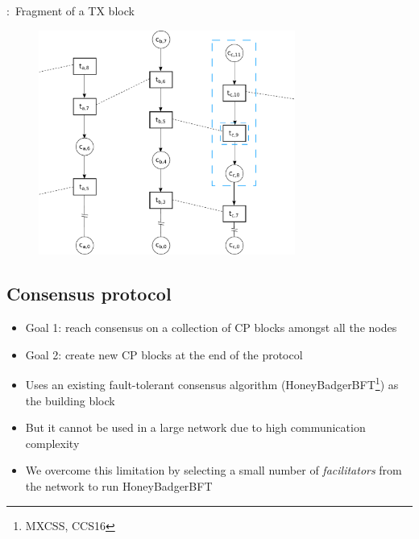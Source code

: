 \documentclass{beamer}
\begin{document}
\begin{frame}{\subsecname:~Fragment of a TX block}
  \begin{figure}[h]
  \includegraphics[width=0.75\textwidth]{trustchain-good-cp-frag}
  \centering
  \end{figure}
\end{frame}

\subsection{Consensus protocol}

\begin{frame}{\subsecname}
  \begin{itemize}
    \item Goal 1: reach consensus on a collection of CP blocks amongst all the nodes
    \item Goal 2: create new CP blocks at the end of the protocol
    \item Uses an existing fault-tolerant consensus algorithm (HoneyBadgerBFT\footnote{MXCSS, CCS16}) as the building block
    \item But it cannot be used in a large network due to high communication complexity
    \item We overcome this limitation by selecting a small number of \emph{facilitators} from the network to run HoneyBadgerBFT
  \end{itemize}
\end{frame}
\end{document}
